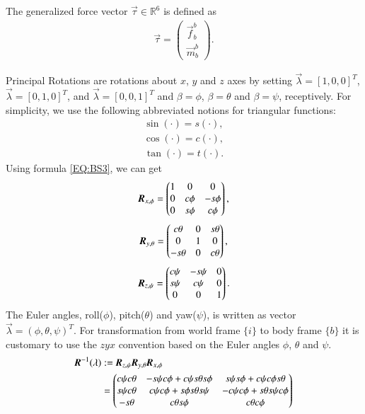 The generalized force vector $\vec{\tau}\in \mathbb{R}^{6}$ is defined as
\begin{align}
\vec{\tau}=
\begin{pmatrix}
\vec{f}^{b}_{b} \\
\vec{m}^{b}_{b}
\end{pmatrix}.
\end{align}

Principal Rotations are rotations about $x$, $y$ and $z$ axes by setting $\vec{\lambda}=[1, 0, 0]^{T}$, $\vec{\lambda}=[0, 1, 0]^{T}$, and $\vec{\lambda}=[0, 0, 1]^{T}$ and $\beta=\phi$, $\beta=\theta$ and $\beta=\psi$, receptively. For simplicity, we use the following abbreviated notions for triangular functions:
\begin{align}
\sin(\cdot)=s(\cdot),
\end{align}
\begin{align}
\cos(\cdot)=c(\cdot),
\end{align}
\begin{align}
\tan(\cdot)=t(\cdot).
\end{align}
Using formula \ref{EQ:BS3}, we can get
\begin{align}
\emph{\textbf{R}}_{x,\phi}=\begin{pmatrix}
1&0&0\\
0&c \phi&-s \phi\\
0&s \phi&c \phi
\end{pmatrix},
\end{align}
\begin{align}
\emph{\textbf{R}}_{y,\theta}=\begin{pmatrix}
c \theta&0&s \theta\\
0&1&0\\
-s \theta&0&c \theta
\end{pmatrix},
\end{align}
\begin{align}
\emph{\textbf{R}}_{z,\psi}=\begin{pmatrix}
c \psi&-s \psi&0\\
s \psi&c \psi&0\\
0&0&1
\end{pmatrix}.
\end{align}
The Euler angles, roll($\phi$), pitch($\theta$) and yaw($\psi$), is written as vector $\vec{\lambda}=(\phi, \theta, \psi)^{T}$. For transformation from world frame $\lbrace i \rbrace$ to body frame $\lbrace b \rbrace$ it is customary to use the $zyx$ convention based on the Euler angles $\phi$, $\theta$ and $\psi$. 
\begin{align}
\emph{\textbf{R}}^{-1}(\vec{\lambda})&:=\emph{\textbf{R}}_{z, \psi}\emph{\textbf{R}}_{y, \theta}\emph{\textbf{R}}_{x, \phi} \nonumber \\
&=\begin{pmatrix}
c\psi c\theta&-s\psi c\phi+c\psi s\theta s\phi&s\psi s\phi+c\psi c\phi s\theta \\
s\psi c\theta&c\psi c\phi+s\phi s\theta s\psi&-c\psi c\phi+s\theta s\psi c\phi\\
-s\theta&c \theta s \phi&c \theta c\phi
\end{pmatrix}
\end{align}
